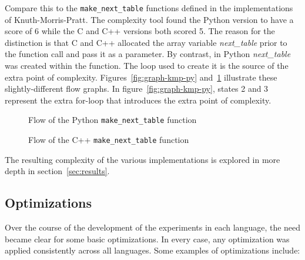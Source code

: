 Compare this to the \texttt{make\_next\_table} functions defined in the implementations of Knuth-Morris-Pratt. The complexity tool found the Python version to have a score of 6 while the C and C++ versions both scored 5. The reason for the distinction is that C and C++ allocated the array variable \textit{next\_table} prior to the function call and pass it as a parameter. By contrast, in Python \textit{next\_table} was created within the function. The loop used to create it is the source of the extra point of complexity. Figures~\ref{fig:graph-kmp-py} and~\ref{fig:graph-kmp-cpp} illustrate these slightly-different flow graphs. In figure~\ref{fig:graph-kmp-py}, states 2 and 3 represent the extra for-loop that introduces the extra point of complexity.

\begin{figure}[ht]
\centering
\begin{minipage}[t]{0.45\textwidth}
\centering

\caption{Flow of the Python \texttt{make\_next\_table} function}
\label{fig:graph-kmp-py}
\end{minipage}\hfill
\begin{minipage}[t]{0.45\textwidth}
\centering

\caption{Flow of the C++ \texttt{make\_next\_table} function}
\label{fig:graph-kmp-cpp}
\end{minipage}
\end{figure}

The resulting complexity of the various implementations is explored in more depth in section~\ref{sec:results}.

\subsection{Optimizations}

Over the course of the development of the experiments in each language, the need became clear for some basic optimizations. In every case, any optimization was applied consistently across all languages. Some examples of optimizations include:

